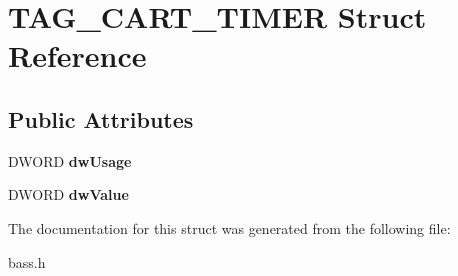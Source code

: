 \section{T\+A\+G\+\_\+\+C\+A\+R\+T\+\_\+\+T\+I\+M\+E\+R Struct Reference}
\label{struct_t_a_g___c_a_r_t___t_i_m_e_r}
\subsection*{Public Attributes}
\begin{DoxyCompactItemize}
\item 
D\+W\+O\+R\+D {\bfseries dw\+Usage}\label{struct_t_a_g___c_a_r_t___t_i_m_e_r_aa40808e77b3759fe9126c02f027271d9}

\item 
D\+W\+O\+R\+D {\bfseries dw\+Value}\label{struct_t_a_g___c_a_r_t___t_i_m_e_r_aa5bbaed34d05a4febf635a1a46fe72b0}

\end{DoxyCompactItemize}


The documentation for this struct was generated from the following file\+:\begin{DoxyCompactItemize}
\item 
bass.\+h\end{DoxyCompactItemize}
